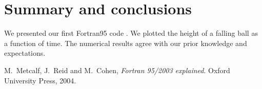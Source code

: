 \documentclass[12pt]{article}
\begin{document}
\section{Summary and conclusions}

We presented our first Fortran95 code \cite{metcalf}. We plotted the height of a falling ball as a function of time.
The numerical results agree with our prior knowledge and expectations.

\begin{thebibliography}{}


 M.\ Metcalf, J.\ Reid and M.\ Cohen, {\it Fortran 95/2003 explained}. Oxford University Press, 2004.
 

\end{thebibliography}
\end{document}
